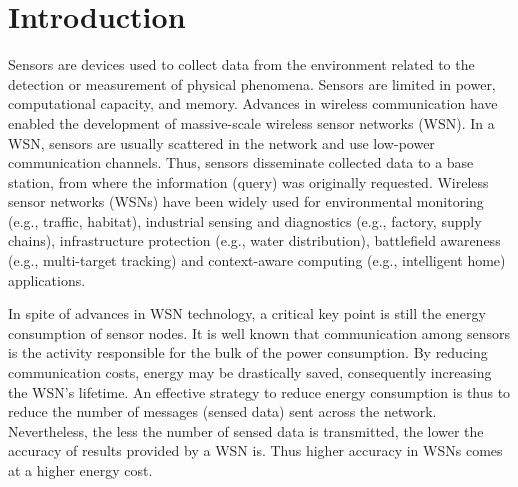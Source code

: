 \documentclass[conference]{IEEEtran}
\begin{document}





%
\IEEEpeerreviewmaketitle



\section{Introduction}


Sensors are devices used to collect data from the environment related to the
detection or measurement of physical phenomena. Sensors are limited in power,
computational capacity, and memory. Advances in wireless communication have
enabled the development of massive-scale wireless sensor networks (WSN). In a
WSN, sensors are usually scattered in the network and use low-power
communication channels. Thus, sensors disseminate collected data to a base
station, from where the information (query) was originally requested. Wireless
sensor networks (WSNs) have been widely used for environmental monitoring (e.g.,
traffic, habitat), industrial sensing and diagnostics (e.g., factory, supply
chains), infrastructure protection (e.g., water distribution), battlefield
awareness (e.g., multi-target tracking) and context-aware computing (e.g.,
intelligent home) applications.

In spite of advances in WSN technology, a critical key point is still the
energy consumption of sensor nodes. It is well known that communication among
sensors is the activity responsible for the bulk of the power consumption. By
reducing communication costs, energy may be drastically saved, consequently
increasing the WSN's lifetime. An effective strategy to reduce energy
consumption is thus to reduce the number of messages (sensed data) sent across
the network. Nevertheless, the less the number of sensed data is transmitted,
the lower the accuracy of results provided by a WSN is. Thus higher accuracy in
WSNs comes at a higher energy cost.
\end{document}
